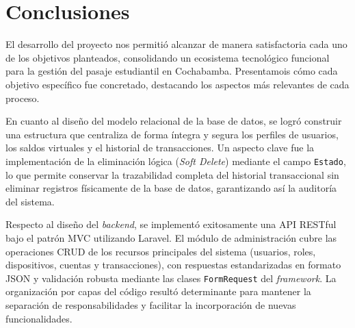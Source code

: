\documentclass[12pt,letterpaper]{report}
\begin{document}
	
	
	
	\chapter{Conclusiones}
	
	El desarrollo del proyecto nos permitió alcanzar de manera satisfactoria cada uno de los objetivos planteados, consolidando un ecosistema tecnológico funcional para la gestión del pasaje estudiantil en Cochabamba. Presentamois cómo cada objetivo específico fue concretado, destacando los aspectos más relevantes de cada proceso.
	
	En cuanto al diseño del modelo relacional de la base de datos, se logró construir una estructura que centraliza de forma íntegra y segura los perfiles de usuarios, los saldos virtuales y el historial de transacciones. Un aspecto clave fue la implementación de la eliminación lógica (\textit{Soft Delete}) mediante el campo \texttt{Estado}, lo que permite conservar la trazabilidad completa del historial transaccional sin eliminar registros físicamente de la base de datos, garantizando así la auditoría del sistema.
	
	Respecto al diseño del \textit{backend}, se implementó exitosamente una API RESTful bajo el patrón MVC utilizando Laravel. El módulo de administración cubre las operaciones CRUD de los recursos principales del sistema (usuarios, roles, dispositivos, cuentas y transacciones), con respuestas estandarizadas en formato JSON y validación robusta mediante las clases \texttt{FormRequest} del \textit{framework}. La organización por capas del código resultó determinante para mantener la separación de responsabilidades y facilitar la incorporación de nuevas funcionalidades.
	
\end{document}
